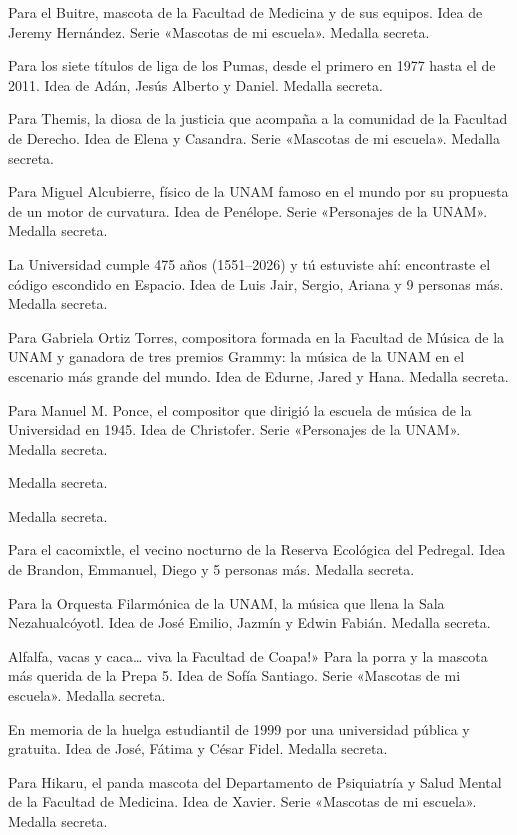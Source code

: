 \begin{description}[leftmargin=1.4cm, style=nextline]
  \item[BV1TR3S] Para el Buitre, mascota de la Facultad de Medicina y de sus equipos. Idea de Jeremy Hernández. Serie «Mascotas de mi escuela». Medalla secreta.
  \item[L4PR1M3R4] Para los siete títulos de liga de los Pumas, desde el primero en 1977 hasta el de 2011. Idea de Adán, Jesús Alberto y Daniel. Medalla secreta.
  \item[TH3M1S] Para Themis, la diosa de la justicia que acompaña a la comunidad de la Facultad de Derecho. Idea de Elena y Casandra. Serie «Mascotas de mi escuela». Medalla secreta.
  \item[4LCUB13RR3] Para Miguel Alcubierre, físico de la UNAM famoso en el mundo por su propuesta de un motor de curvatura. Idea de Penélope. Serie «Personajes de la UNAM». Medalla secreta.
  \item[UNAM1551] La Universidad cumple 475 años (1551–2026) y tú estuviste ahí: encontraste el código escondido en Espacio. Idea de Luis Jair, Sergio, Ariana y 9 personas más. Medalla secreta.
  \item[GR4MMYS] Para Gabriela Ortiz Torres, compositora formada en la Facultad de Música de la UNAM y ganadora de tres premios Grammy: la música de la UNAM en el escenario más grande del mundo. Idea de Edurne, Jared y Hana. Medalla secreta.
  \item[MP0NC3] Para Manuel M. Ponce, el compositor que dirigió la escuela de música de la Universidad en 1945. Idea de Christofer. Serie «Personajes de la UNAM». Medalla secreta.
  \item[PUM4M0R] Medalla secreta.
  \item[N0STR3S] Medalla secreta.
  \item[C4C0M1X] Para el cacomixtle, el vecino nocturno de la Reserva Ecológica del Pedregal. Idea de Brandon, Emmanuel, Diego y 5 personas más. Medalla secreta.
  \item[0FUN4M] Para la Orquesta Filarmónica de la UNAM, la música que llena la Sala Nezahualcóyotl. Idea de José Emilio, Jazmín y Edwin Fabián. Medalla secreta.
  \item[V4C4CO4P4] Alfalfa, vacas y caca… viva la Facultad de Coapa!» Para la porra y la mascota más querida de la Prepa 5. Idea de Sofía Santiago. Serie «Mascotas de mi escuela». Medalla secreta.
  \item[1999UNAM] En memoria de la huelga estudiantil de 1999 por una universidad pública y gratuita. Idea de José, Fátima y César Fidel. Medalla secreta.
  \item[H1K4RU] Para Hikaru, el panda mascota del Departamento de Psiquiatría y Salud Mental de la Facultad de Medicina. Idea de Xavier. Serie «Mascotas de mi escuela». Medalla secreta.

\end{description}
